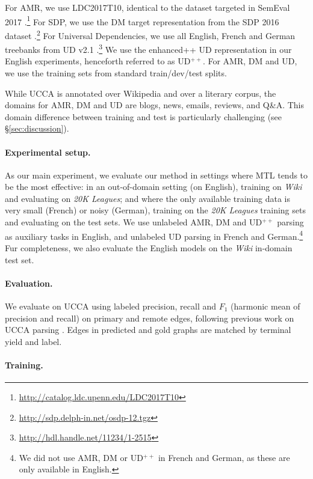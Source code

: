 \documentclass[11pt,a4paper]{article}
\begin{document}
For AMR, we use LDC2017T10, identical to the dataset targeted in SemEval 2017
\cite{may2017semeval}.\footnote{\mbox{\url{http://catalog.ldc.upenn.edu/LDC2017T10}}}
For SDP, we use the DM target representation from the SDP 2016 dataset
\cite{oepen2016towards}.\footnote{\url{http://sdp.delph-in.net/osdp-12.tgz}}
For Universal Dependencies, we use all English, French and German treebanks from UD v2.1
\cite{11234/1-2515}.\footnote{\url{http://hdl.handle.net/11234/1-2515}}
We use the enhanced++ UD representation \cite{SCHUSTER16.779} in our English experiments,
henceforth referred to as UD$^{++}$.
For AMR, DM and UD, we use the training sets from standard train/dev/test splits.

While UCCA is annotated over Wikipedia and over a literary corpus,
the domains for AMR, DM and UD are blogs, news, emails, reviews, and Q\&A.
This domain difference between training and test is particularly challenging (see \S\ref{sec:discussion}).

\paragraph{Experimental setup.}

As our main experiment, we evaluate our method in settings where MTL tends to be the most effective:
in an out-of-domain setting (on English),
training on \textit{Wiki} and evaluating on \textit{20K Leagues};
and where the only available training data is very small (French)
or noisy (German), training on the \textit{20K Leagues} training sets and evaluating on the test sets.
We use unlabeled AMR, DM and UD$^{++}$ parsing as auxiliary tasks in English,
and unlabeled UD parsing in French and German.\footnote{We did not use AMR, DM or UD$^{++}$ in French
and German, as these are only available in English.}
Fur completeness, we also evaluate the English models on the \textit{Wiki} in-domain test set.


\paragraph{Evaluation.}

We evaluate on UCCA using labeled precision, recall and $F_1$ (harmonic mean of precision and recall)
on primary and remote edges,
following previous work on UCCA parsing \cite{hershcovich2017a}.
Edges in predicted and gold graphs are matched by terminal yield and label.



\paragraph{Training.}
\end{document}
